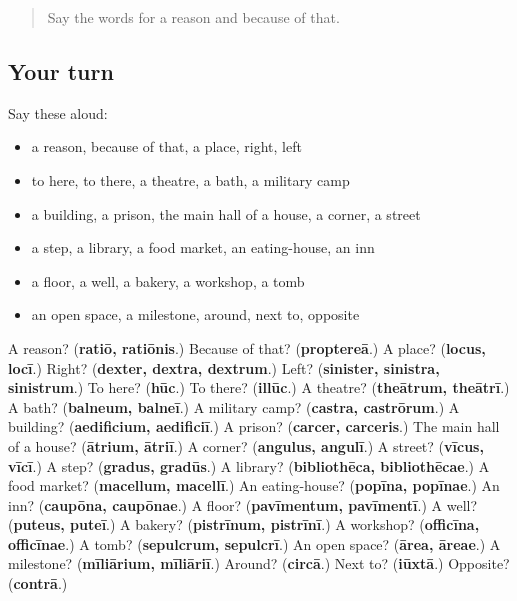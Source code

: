\begin{quote}
Say the words for a reason and because of that.
\end{quote}

\subsection*{Your turn}
Say these aloud:

\begin{itemize}
\raggedright
  \item a reason, because of that, a place, right, left
  \item to here, to there, a theatre, a bath, a military camp
  \item a building, a prison, the main hall of a house, a corner, a street
  \item a step, a library, a food market, an eating-house, an inn
  \item a floor, a well, a bakery, a workshop, a tomb
  \item an open space, a milestone, around, next to, opposite
\end{itemize}

\begin{tcolorbox}[breakable,colback=teal!4,colframe=teal!35!black,title={Before you move on}]
A reason? (\textbf{ratiō, ratiōnis}.) Because of that? (\textbf{proptereā}.) A place? (\textbf{locus, locī}.) Right? (\textbf{dexter, dextra, dextrum}.) Left? (\textbf{sinister, sinistra, sinistrum}.) To here? (\textbf{hūc}.) To there? (\textbf{illūc}.) A theatre? (\textbf{theātrum, theātrī}.) A bath? (\textbf{balneum, balneī}.) A military camp? (\textbf{castra, castrōrum}.) A building? (\textbf{aedificium, aedificiī}.) A prison? (\textbf{carcer, carceris}.) The main hall of a house? (\textbf{ātrium, ātriī}.) A corner? (\textbf{angulus, angulī}.) A street? (\textbf{vīcus, vīcī}.) A step? (\textbf{gradus, gradūs}.) A library? (\textbf{bibliothēca, bibliothēcae}.) A food market? (\textbf{macellum, macellī}.) An eating-house? (\textbf{popīna, popīnae}.) An inn? (\textbf{caupōna, caupōnae}.) A floor? (\textbf{pavīmentum, pavīmentī}.) A well? (\textbf{puteus, puteī}.) A bakery? (\textbf{pistrīnum, pistrīnī}.) A workshop? (\textbf{officīna, officīnae}.) A tomb? (\textbf{sepulcrum, sepulcrī}.) An open space? (\textbf{ārea, āreae}.) A milestone? (\textbf{mīliārium, mīliāriī}.) Around? (\textbf{circā}.) Next to? (\textbf{iūxtā}.) Opposite? (\textbf{contrā}.)
\end{tcolorbox}
